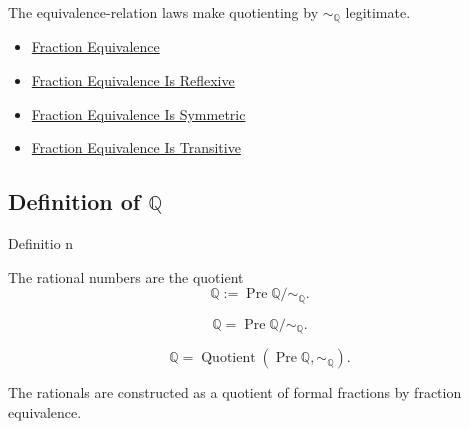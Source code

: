 \begin{remark*}[Interpretation]
The equivalence-relation laws make quotienting by $\sim_{\mathbb{Q}}$
legitimate.
\end{remark*}

\begin{dependencies}
\begin{itemize}
\item \hyperref[def:fraction-equivalence]{Fraction Equivalence}
  \item \hyperref[lem:fraction-equivalence-reflexive]{Fraction Equivalence Is Reflexive}
  \item \hyperref[lem:fraction-equivalence-symmetric]{Fraction Equivalence Is Symmetric}
  \item \hyperref[lem:fraction-equivalence-transitive]{Fraction Equivalence Is Transitive}
\end{itemize}
\end{dependencies}

\subsection*{\texorpdfstring{Definition of $\mathbb{Q}$}{Definition of Q}}

\begin{definitionbox}{Definitio
n}
\begin{definition}
\label{def:rationals}
The rational numbers are the quotient
\[
\mathbb{Q}:=\operatorname{Pre}\mathbb{Q}/{\sim_{\mathbb{Q}}}.
\]
\end{definition}
\end{definitionbox}


\begin{remark*}
\[
\mathbb{Q}=\operatorname{Pre}\mathbb{Q}/{\sim_{\mathbb{Q}}}.
\]
\end{remark*}

\begin{remark*}
\[
\mathbb{Q}=\operatorname{Quotient}(\operatorname{Pre}\mathbb{Q},\sim_{\mathbb{Q}}).
\]
\end{remark*}

\begin{remark*}[Interpretation]
The rationals are constructed as a quotient of formal fractions by fraction
equivalence.
\end{remark*}

